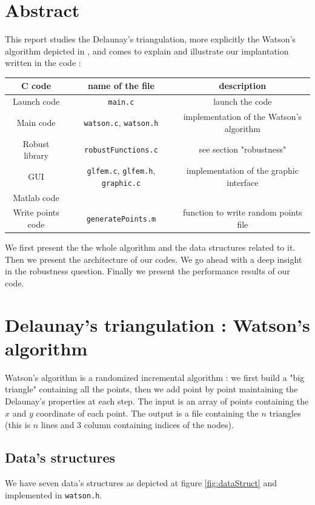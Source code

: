 \section*{Abstract}
This report studies the Delaunay's triangulation, more explicitly the Watson's algorithm depicted in \cite{de2000computational}, and comes to explain and illustrate our implantation written in the code : 
\begin{table}[h!]
\centering
\begin{tabular}{c|cc}
C code & name of the file & description \\
\hline
Launch code & \texttt{main.c} & launch the code \\
Main code & \texttt{watson.c}, \texttt{watson.h} & implementation of the Watson's algorithm \\
Robust library & \texttt{robustFunctions.c} & see section "robustness" \\
GUI & \texttt{glfem.c}, \texttt{glfem.h}, \texttt{graphic.c} & implementation of the graphic interface \\
\hline
\hline
Matlab code & & \\
\hline 
Write points code & \texttt{generatePoints.m} & function to write random points file
\end{tabular}
\end{table} 

We first present the the whole algorithm and the data structures related to it. Then we present the architecture of our codes. We go ahead with a deep insight in the robustness question. Finally we present the performance results of our code. 

\newpage
\section{Delaunay's triangulation : Watson's algorithm}
Watson's algorithm \cite{de2000computational} is a randomized incremental algorithm : we first build a "big triangle" containing all the points, then we add point by point maintaining the Delaunay's properties at each step. The input is an array of points containing the $x$ and $y$ coordinate of each point. The output is a file containing the $n$ triangles (this is $n$ lines and $3$ column containing indices of the nodes).

\subsection*{Data's structures}
We have seven data's structures as depicted at figure \ref{fig:dataStruct} and implemented in \texttt{watson.h}.

